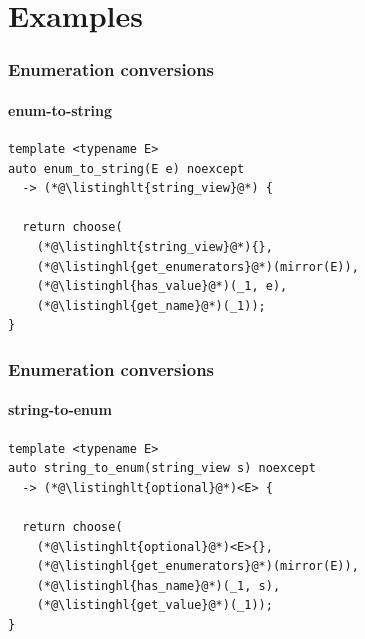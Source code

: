 \documentclass[compress,table,xcolor=table]{beamer}
\begin{document}
\section{Examples}
\begin{frame}[fragile]
  \frametitle{Enumeration conversions}
  \framesubtitle{enum-to-string}
  \begin{lstlisting}[language=c++2x]
template <typename E>
auto enum_to_string(E e) noexcept
  -> (*@\listinghlt{string_view}@*) {

  return choose(
    (*@\listinghlt{string_view}@*){},
    (*@\listinghl{get_enumerators}@*)(mirror(E)),
    (*@\listinghl{has_value}@*)(_1, e),
    (*@\listinghl{get_name}@*)(_1));
}
  \end{lstlisting}
\end{frame}
\begin{frame}[fragile]
  \frametitle{Enumeration conversions}
  \framesubtitle{string-to-enum}
  \begin{lstlisting}[language=c++2x]
template <typename E>
auto string_to_enum(string_view s) noexcept
  -> (*@\listinghlt{optional}@*)<E> {

  return choose(
    (*@\listinghlt{optional}@*)<E>{},
    (*@\listinghl{get_enumerators}@*)(mirror(E)),
    (*@\listinghl{has_name}@*)(_1, s),
    (*@\listinghl{get_value}@*)(_1));
}
  \end{lstlisting}
\end{frame}
\end{document}
